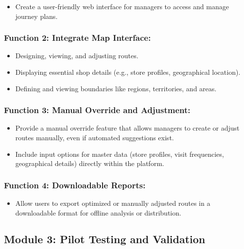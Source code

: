 \begin{itemize}
    \item Create a user-friendly web interface for managers to access and manage journey plans.
\end{itemize}
\subsubsection*{Function 2: Integrate Map Interface:
}

    \begin{itemize}
        \item Designing, viewing, and adjusting routes.
        \item Displaying essential shop details (e.g., store profiles, geographical location).
        \item Defining and viewing boundaries like regions, territories, and areas.
    \end{itemize}

\subsubsection*{Function 3: Manual Override and Adjustment: 
}

\begin{itemize}
    \item Provide a manual override feature that allows managers to create or adjust routes manually, even if automated suggestions exist.
    \item Include input options for master data (store profiles, visit frequencies, geographical details) directly within the platform.
\end{itemize}

\subsubsection*{Function 4: Downloadable Reports: 
}

\begin{itemize}
    \item Allow users to export optimized or manually adjusted routes in a downloadable format for offline analysis or distribution.
\end{itemize}

\subsection*{Module 3: Pilot Testing and Validation }

